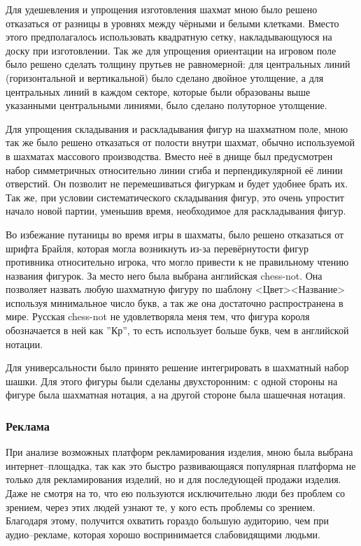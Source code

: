 Для удешевления и упрощения изготовления шахмат мною было решено отказаться от
разницы в уровнях между чёрными и белыми клетками. Вместо этого предполагалось
использовать квадратную сетку, накладывающуюся на доску при изготовлении. Так
же для упрощения ориентации на игровом поле было решено сделать толщину прутьев
не равномерной: для центральных линий (горизонтальной и вертикальной) было
сделано двойное утолщение, а для центральных линий в каждом секторе, которые
были образованы выше указанными центральными линиями, было сделано полуторное
утолщение.

Для упрощения складывания и раскладывания фигур на шахматном поле, мною так же
было решено отказаться от полости внутри шахмат, обычно используемой в шахматах
массового производства. Вместо неё в днище был предусмотрен набор симметричных
относительно линии сгиба и перпендикулярной её линии отверстий. Он позволит не
перемешиваться фигуркам и будет удобнее брать их. Так же, при условии
систематического складывания фигур, это очень упростит начало новой партии,
уменьшив время, необходимое для раскладывания фигур.

Во избежание путаницы во время игры в шахматы, было решено отказаться от шрифта
Брайля, которая могла возникнуть из-за перевёрнутости фигур противника
относительно игрока, что могло привести к не правильному чтению названия
фигурок. За место него была выбрана английская \gls{chess-not}. Она позволяет
назвать любую шахматную фигуру по шаблону <Цвет><Название> используя
минимальное число букв, а так же она достаточно распространена в мире. Русская
\gls{chess-not} не удовлетворяла меня тем, что фигура короля обозначается в ней как
''Кр'', то есть использует больше букв, чем в английской нотации.

Для универсальности было принято решение интегрировать в шахматный набор шашки.
Для этого фигуры были сделаны двухсторонним: с одной стороны на фигуре была
шахматная нотация, а на другой стороне была шашечная нотация.

\subsubsection{Реклама}
При анализе возможных платформ рекламирования изделия, мною была выбрана
интернет--площадка, так как это быстро развивающаяся популярная платформа не
только для рекламирования изделий, но и для последующей продажи изделия. Даже
не смотря на то, что ею пользуются исключительно люди без проблем со зрением,
через этих людей узнают те, у кого есть проблемы со зрением. Благодаря этому,
получится охватить гораздо большую аудиторию, чем при аудио--рекламе, которая
хорошо воспринимается слабовидящими людьми.

